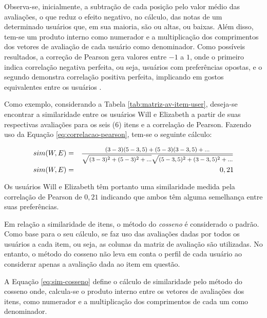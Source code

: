          Observa-se, inicialmente, a subtração de cada posição pelo valor médio das avaliações, o que reduz o efeito negativo, no cálculo, das notas de um determinado usuários que, em sua maioria, são ou altas, ou baixas. Além disso, tem-se um produto interno como numerador e a multiplicação dos comprimentos dos vetores de avaliação de cada usuário como denominador. Como possíveis resultados, a correção de Pearson gera valores entre $-1$ a $1$, onde o primeiro indica correlação negativa perfeita, ou seja, usuários com preferências opostas, e o segundo demonstra correlação positiva perfeita, implicando em gostos equivalentes entre os usuários \cite{Jannach2010}.
        
        
        Como exemplo, considerando a Tabela \ref{tab:matriz-av-item-user}, deseja-se encontrar a similaridade entre os usuários Will e Elizabeth a partir de suas respectivas avaliações para os seis (6) itens e a correlação de Pearson. Fazendo uso da Equação \ref{eq:correlacao-pearson}, tem-se o seguinte cálculo:
        
        \begin{eqnarray}
            sim(W, E) &=& \text{\footnotesize   $\frac{(3-3)(5-3,5)+(5-3)(3-3,5)+...}{\sqrt{(3-3)^2+(5-3)^2+...}\sqrt{(5-3,5)^2+(3-3,5)^2+...}} $} \nonumber \\
            sim(W, E) &=& 0,21 \nonumber
        \end{eqnarray}
    
        Os usuários Will e Elizabeth têm portanto uma similaridade medida pela correlação de Pearson de $0,21$ indicando que ambos têm alguma semelhança entre suas preferências.
    
        Em relação a similaridade de itens, o método do \textit{cosseno} é considerado o padrão. Como base para o seu cálculo, se faz uso das avaliações dadas por todos os usuários a cada item, ou seja, as colunas da matriz de avaliação são utilizadas. No entanto, o método do cosseno não leva em conta o perfil de cada usuário ao considerar apenas a avaliação dada ao item em questão\cite{Jannach2010}.
        
        A Equação \ref{eq:sim-cosseno} define o cálculo de similaridade pelo método do cosseno onde, calcula-se o produto interno entre os vetores de avaliações dos itens, como numerador e a multiplicação dos comprimentos de cada um como denominador.         
        
